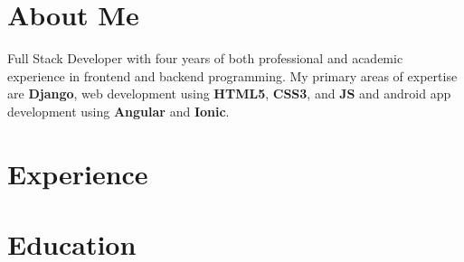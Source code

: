 \documentclass{article}
\begin{document}
\section{About Me}
Full Stack Developer with four years of both
professional and academic experience in frontend
and backend programming. My primary areas of
expertise are \textbf{Django}, web development using \textbf{HTML5},
\textbf{CSS3}, and \textbf{JS} and android app development using
\textbf{Angular} and \textbf{Ionic}.

\section{Experience}

\section{Education}
\end{document}
